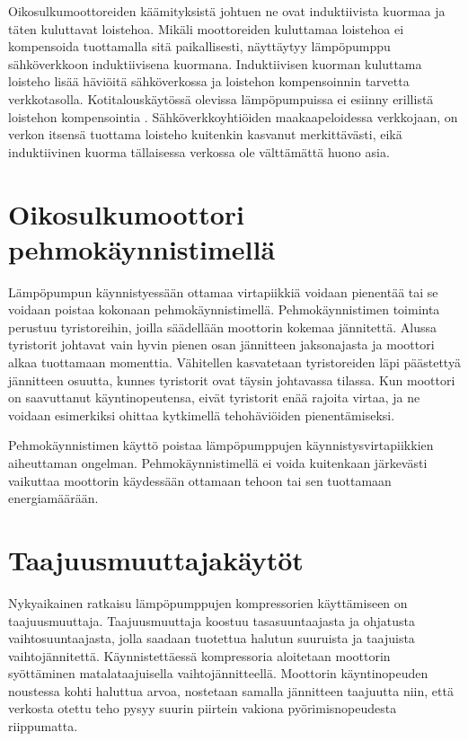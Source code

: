   Oikosulkumoottoreiden käämityksistä johtuen ne ovat induktiivista kuormaa ja täten kuluttavat loistehoa. Mikäli moottoreiden kuluttamaa loistehoa ei kompensoida tuottamalla sitä paikallisesti, näyttäytyy lämpöpumppu sähköverkkoon induktiivisena kuormana. Induktiivisen kuorman kuluttama loisteho lisää häviöitä sähköverkossa ja loistehon kompensoinnin tarvetta verkkotasolla. \parencite{pakonen} Kotitalouskäytössä olevissa lämpöpumpuissa ei esiinny erillistä loistehon kompensointia \parencite{Manner}. Sähköverkkoyhtiöiden maakaapeloidessa verkkojaan, on verkon itsensä tuottama loisteho kuitenkin kasvanut merkittävästi, eikä induktiivinen kuorma tällaisessa verkossa ole välttämättä huono asia.


\section{Oikosulkumoottori pehmokäynnistimellä}
  Lämpöpumpun käynnistyessään ottamaa virtapiikkiä voidaan pienentää tai se voidaan poistaa kokonaan pehmokäynnistimellä. Pehmokäynnistimen toiminta perustuu tyristoreihin, joilla säädellään moottorin kokemaa jännitettä. Alussa tyristorit johtavat vain hyvin pienen osan jännitteen jaksonajasta ja moottori alkaa tuottamaan momenttia. Vähitellen kasvatetaan tyristoreiden läpi päästettyä jännitteen osuutta, kunnes tyristorit ovat täysin johtavassa tilassa. Kun moottori on saavuttanut käyntinopeutensa, eivät tyristorit enää rajoita virtaa, ja ne voidaan esimerkiksi ohittaa kytkimellä tehohäviöiden pienentämiseksi. \parencite{pehmokaynnistinopas}

  Pehmokäynnistimen käyttö poistaa lämpöpumppujen käynnistysvirtapiikkien aiheuttaman ongelman. Pehmokäynnistimellä ei voida kuitenkaan järkevästi vaikuttaa moottorin käydessään ottamaan tehoon tai sen tuottamaan energiamäärään.

\section{Taajuusmuuttajakäytöt}
  Nykyaikainen ratkaisu lämpöpumppujen kompressorien käyttämiseen on taajuusmuuttaja. Taajuusmuuttaja koostuu tasasuuntaajasta ja ohjatusta vaihtosuuntaajasta, jolla saadaan tuotettua halutun suuruista ja taajuista vaihtojännitettä. Käynnistettäessä kompressoria aloitetaan moottorin syöttäminen matalataajuisella vaihtojännitteellä. Moottorin käyntinopeuden noustessa kohti haluttua arvoa, nostetaan samalla jännitteen taajuutta niin, että verkosta otettu teho pysyy suurin piirtein vakiona pyörimisnopeudesta riippumatta.

